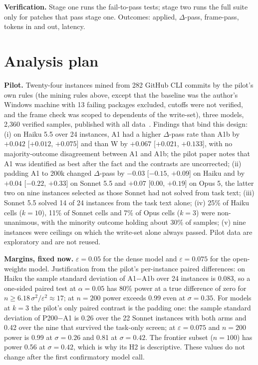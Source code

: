 \documentclass[10pt,conference]{IEEEtran}
\newcommand{\eps}{\varepsilon}
\begin{document}
\textbf{Verification.} Stage one runs the fail-to-pass tests; stage two runs the full suite only for patches that pass stage one. Outcomes: applied, $\Delta$-pass, frame-pass, tokens in and out, latency.

\section{Analysis plan}\label{sec:analysis}

\textbf{Pilot.}\label{sec:pilot} Twenty-four instances mined from 282 GitHub CLI commits by the pilot's own rules (the mining rules above, except that the baseline was the author's Windows machine with 13 failing packages excluded, cutoffs were not verified, and the frame check was scoped to dependents of the write-set), three models, 2,360 verified samples, published with all data~\cite{johansen2026pilot}. Findings that bind this design: (i) on Haiku 5.5 over 24 instances, A1 had a higher $\Delta$-pass rate than A1b by $+0.042$ [$+0.012$, $+0.075$] and than W by $+0.067$ [$+0.021$, $+0.133$], with no majority-outcome disagreement between A1 and A1b; the pilot paper notes that A1 was identified as best after the fact and the contrasts are uncorrected; (ii) padding A1 to 200k changed $\Delta$-pass by $-0.03$ [$-0.15$, $+0.09$] on Haiku and by $+0.04$ [$-0.22$, $+0.33$] on Sonnet 5.5 and $+0.07$ [$0.00$, $+0.19$] on Opus 5, the latter two on nine instances selected as those Sonnet had not solved from task text; (iii) Sonnet 5.5 solved 14 of 24 instances from the task text alone; (iv) 25\% of Haiku cells ($k=10$), 11\% of Sonnet cells and 7\% of Opus cells ($k=3$) were non-unanimous, with the minority outcome holding about 30\% of samples; (v) nine instances were ceilings on which the write-set alone always passed. Pilot data are exploratory and are not reused.

\textbf{Margins, fixed now.} $\eps = 0.05$ for the dense model and $\eps = 0.075$ for the open-weights model. Justification from the pilot's per-instance paired differences: on Haiku the sample standard deviation of A1$-$A1b over 24 instances is 0.083, so a one-sided paired test at $\alpha = 0.05$ has 80\% power at a true difference of zero for $n \ge 6.18\,\sigma^2/\eps^2 \approx 17$; at $n = 200$ power exceeds 0.99 even at $\sigma = 0.35$. For models at $k = 3$ the pilot's only paired contrast is the padding one: the sample standard deviation of P200$-$A1 is 0.26 over the 22 Sonnet instances with both arms and 0.42 over the nine that survived the task-only screen; at $\eps = 0.075$ and $n = 200$ power is 0.99 at $\sigma = 0.26$ and 0.81 at $\sigma = 0.42$. The frontier subset ($n = 100$) has power 0.56 at $\sigma = 0.42$, which is why its H2 is descriptive. These values do not change after the first confirmatory model call.
\end{document}
